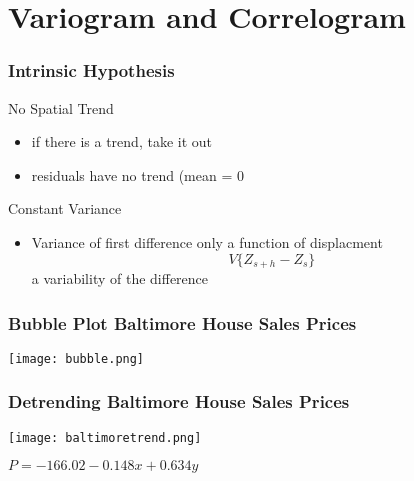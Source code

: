 \documentclass[nototal,handout]{beamer}
\begin{document}
\section{Variogram and Correlogram}
\begin{frame}
  \frametitle{Intrinsic Hypothesis}
  \begin{block}{No Spatial Trend}
    \begin{itemize}
  \item if there is a trend, take it out
  \item residuals have no trend (mean = 0
    \end{itemize}
   \end{block}
   \begin{block}{Constant Variance}
     \begin{itemize}
       \item Variance of first difference only a function of displacment
	 \begin{equation}
	   V \{Z_{s+h} - Z_s \}
	   \label{}
	 \end{equation}a
	 variability of the difference
     \end{itemize}
   \end{block}

 \end{frame}

\begin{frame}[<+->]
  \frametitle{Bubble Plot Baltimore House Sales Prices}
    \begin{center}
      \texttt{[image: bubble.png]}
    \end{center}
 \end{frame}

\begin{frame}[<+->]
  \frametitle{Detrending Baltimore House Sales Prices}
    \begin{center}
      \texttt{[image: baltimoretrend.png]}

    $P=-166.02 - 0.148x + 0.634y$
    \end{center}
 \end{frame}
\end{document}
